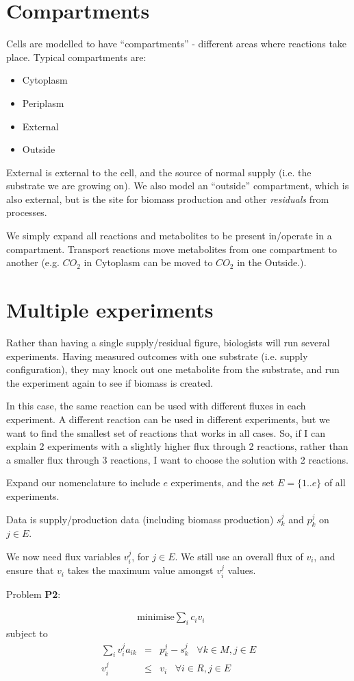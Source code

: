 \documentclass[12pt,twoside,fleqn,a4paper]{article}
\begin{document}
\section{Compartments}

Cells are modelled to have ``compartments'' - different areas where
reactions take place. Typical compartments are:
\begin{itemize}
\item Cytoplasm
\item Periplasm
\item External
\item Outside
\end{itemize}

External is external to the cell, and the source of normal supply
(i.e. the substrate we are growing on). We also model an ``outside''
compartment, which is also external, but is the site for biomass
production and other {\it residuals} from processes.

We simply expand all reactions and metabolites to be present
in/operate in a compartment. Transport reactions move metabolites from
one compartment to another (e.g. $CO_2$ in Cytoplasm can be moved to
$CO_2$ in the Outside.).

\section{Multiple experiments}

Rather than having a single supply/residual figure, biologists will
run several experiments. Having measured outcomes with one substrate
(i.e. supply configuration), they may knock out one metabolite from
the substrate, and run the experiment again to see if biomass is
created.

In this case, the same reaction can be used with different fluxes in
each experiment. A different reaction can be used in different
experiments, but we want to find the smallest set of reactions that
works in all cases. So, if I can explain 2 experiments with a slightly
higher flux through 2 reactions, rather than a smaller flux through 3
reactions, I want to choose the solution with 2 reactions.

Expand our nomenclature to include $e$ experiments, and the set $E =
\{1..e\}$ of all experiments.

Data is supply/production data (including biomass production) $s^j_k$ and
$p^j_k$ on $j \in E$.

We now need flux variables $v^j_i$, for $j \in E$. We
still use an overall flux of $v_i$, and ensure that $v_i$ takes the
maximum value amongst $v^j_i$ values.

Problem {\bf P2}:

\begin{eqnarray}
  \mbox{minimise} \sum_i c_i v_i & & 
\end{eqnarray}
subject to
\begin{eqnarray}
  \sum_i v^j_i a_{ik} & = & p^j_k - s^j_k \;\;\; \forall k \in
  M, j \in E \label{eqn:metbal3} \\
  v^j_i & \le & v_i \;\;\; \forall i \in R, j \in E\label{eqn:expflux}
\end{eqnarray}
\end{document}
